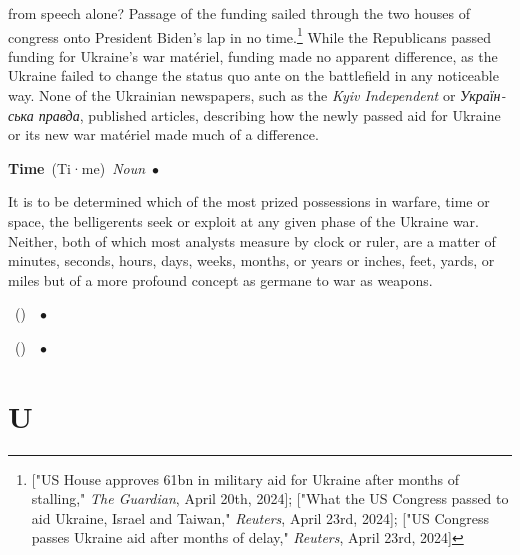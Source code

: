 \documentclass[10pt,a4paper,twoside]{article} %
\newcommand{\entry}[4]{\markboth{#1}{#1}\textbf{#1}\ {(#2)}\ \textit{#3}\ $\bullet$\ {#4}}  %
\begin{document}
\begin{multicols}{2}
{from speech alone? \newline \indent  Passage of the funding sailed through the two houses of congress onto President Biden's lap in no time.\footnote{["US House approves 61bn in military aid for Ukraine after months of stalling," \emph{The Guardian}, April 20th, 2024]; ["What the US Congress passed to aid Ukraine, Israel and Taiwan," \emph{Reuters}, April 23rd, 2024]; ["US Congress passes Ukraine aid after months of delay," \emph{Reuters}, April 23rd, 2024] } While the Republicans passed funding for Ukraine's war \textfrench{matériel}, funding made no apparent difference, as the Ukraine failed to change the status quo ante on the battlefield in any noticeable way. None of the Ukrainian newspapers, such as the \emph{Kyiv Independent} or \textukrainian{\emph{Українська правда}}, published articles, describing how the newly passed aid for Ukraine or its new war \textfrench{matériel} made much of a difference. 
}




\entry{Time} {Ti·me} {Noun} {

It is to be determined which of the most prized possessions in warfare, time or space, the belligerents seek or exploit at any given phase of the Ukraine war. Neither, both of which most analysts measure by clock or ruler, are a matter of minutes, seconds, hours, days, weeks, months, or years or inches, feet, yards, or miles but of a more profound concept as germane to war as weapons. 

}

\entry{} {} {} { 



}

\entry{} {} {} {


}


\end{multicols}


\section*{U}
\end{document}
